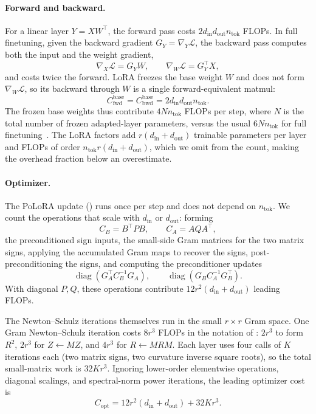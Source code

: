 \documentclass[11pt]{article}
\DeclareMathOperator{\diag}{diag}
\newcommand{\methodname}{PoLoRA\xspace}
\theoremstyle{plain}
\theoremstyle{definition}
\theoremstyle{remark}
\theoremstyle{definition}
\begin{document}
\paragraph{Forward and backward.}
For a linear
layer $Y=XW^\top$, the forward pass costs
$2d_{\mathrm{in}}d_{\mathrm{out}}n_{\mathrm{tok}}$
FLOPs.
In full finetuning, given the backward gradient $G_Y=\nabla_Y \mathcal{L}$,
the backward pass computes both the input and the weight gradient,
\[
\nabla_X \mathcal{L} = G_Y W,
\qquad
\nabla_W \mathcal{L} = G_Y^\top X,
\]
and costs twice the forward. LoRA freezes the base weight $W$ and does not form
$\nabla_W \mathcal{L}$, so its backward through $W$ is a single forward-equivalent matmul:
\begin{equation}
  C_{\mathrm{fwd}}^{\mathrm{base}}
  =
  C_{\mathrm{bwd}}^{\mathrm{base}}
  =
  2 d_{\mathrm{in}}d_{\mathrm{out}} n_{\mathrm{tok}} .
  \label{eq:flop-fb}
\end{equation}
The frozen base weights thus contribute $4Nn_{\mathrm{tok}}$ FLOPs per step, where $N$ is the total number of frozen adapted-layer parameters, versus the usual $6Nn_{\mathrm{tok}}$ for full finetuning~\cite{kaplan2020scaling}. The LoRA factors add $r(d_{\mathrm{in}}+d_{\mathrm{out}})$ trainable parameters per layer and FLOPs of order $n_{\mathrm{tok}}r(d_{\mathrm{in}}+d_{\mathrm{out}})$, which we omit from the count, making the overhead fraction below an overestimate.

\paragraph{Optimizer.}
The \methodname{} update () runs once per step and does not
depend on $n_{\mathrm{tok}}$.
We count the operations that scale with
$d_{\mathrm{in}}$ or $d_{\mathrm{out}}$: forming
\[
    C_B=B^\top P B,
    \qquad
    C_A=A Q A^\top,
\]
the preconditioned sign inputs, 
the small-side Gram matrices for the two
matrix signs, applying the accumulated Gram maps to recover the signs,
post-preconditioning the signs, and computing the preconditioner updates
\[
    \diag(G_A^\top C_B^{-1}G_A),
    \qquad
    \diag(G_B C_A^{-1}G_B^\top).
\]
With diagonal $P, Q$, these operations contribute
$12r^2(d_{\mathrm{in}}+d_{\mathrm{out}})$
leading FLOPs.

The Newton--Schulz iterations themselves run in the small $r\times r$ Gram
space.  One Gram Newton--Schulz iteration costs $8r^3$ FLOPs in the notation of
: $2r^3$ to form $R^2$, $2r^3$ for $Z\leftarrow MZ$, and $4r^3$ for
$R\leftarrow MRM$.  Each layer uses four calls of $K$ iterations each (two matrix
signs, two curvature inverse square roots), so the total small-matrix work is $32Kr^3$.
Ignoring lower-order elementwise operations, diagonal scalings, and spectral-norm
power iterations, the leading optimizer cost is
\begin{equation}
  C_{\mathrm{opt}}
  =
  12r^2(d_{\mathrm{in}}+d_{\mathrm{out}})
  +
  32Kr^3 .
  \label{eq:flop-opt}
\end{equation}
\end{document}
